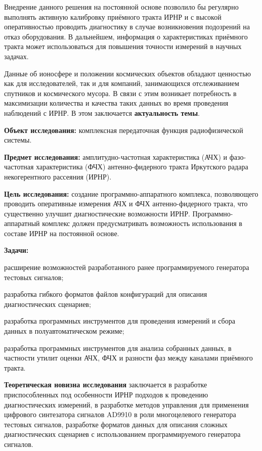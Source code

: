\documentclass{report}
\begin{document}
Внедрение данного решения на постоянной основе позволило бы регулярно выполнять активную калибровку приёмного тракта ИРНР и с высокой оперативностью проводить диагностику в случае возникновения подозрений на отказ оборудования. В дальнейшем, информация о характеристиках приёмного тракта может использоваться для повышения точности измерений в научных задачах.

Данные об ионосфере и положении космических объектов обладают ценностью как для исследователей, так и для компаний, занимающихся отслеживанием спутников и космического мусора. В связи с этим возникает потребность в максимизации количества и качества таких данных во время проведения наблюдений с ИРНР. В этом заключается {\bf актуальность темы}.

{\bf Объект исследования:} комплексная передаточная функция радиофизической системы.

{\bf Предмет исследования:} амплитудно-частотная характеристика (АЧХ) и фазо-частотная характеристика (ФЧХ) антенно-фидерного тракта Иркутского радара некогерентного рассеяния (ИРНР).

{\bf Цель исследования:} создание программно-аппаратного комплекса, позволяющего проводить оперативные измерения АЧХ и ФЧХ антенно-фидерного тракта, что существенно улучшит диагностические возможности ИРНР. Программно-аппаратный комплекс должен предусматривать возможность использования в составе ИРНР на постоянной основе.

{\bf Задачи:}
\begin{enumarabic}
\item расширение возможностей разработанного ранее программируемого генератора тестовых сигналов;
\item разработка гибкого форматов файлов конфигураций для описания диагностических сценариев;
\item разработка программных инструментов для проведения измерений и сбора данных в полуавтоматическом режиме;
\item разработка программных инструментов для анализа собранных данных, в частности утилит оценки АЧХ, ФЧХ и разности фаз между каналами приёмного тракта.
\end{enumarabic}


{\bf Теоретическая новизна исследования} заключается в разработке приспособленных под особенности ИРНР подходов к проведению диагностических измерений, в разработке методов управления для применения цифрового синтезатора сигналов AD9910 в роли многоцелевого генератора тестовых сигналов, разработке форматов данных для описания сложных диагностических сценариев с использованием программируемого генератора сигналов.
\end{document}
